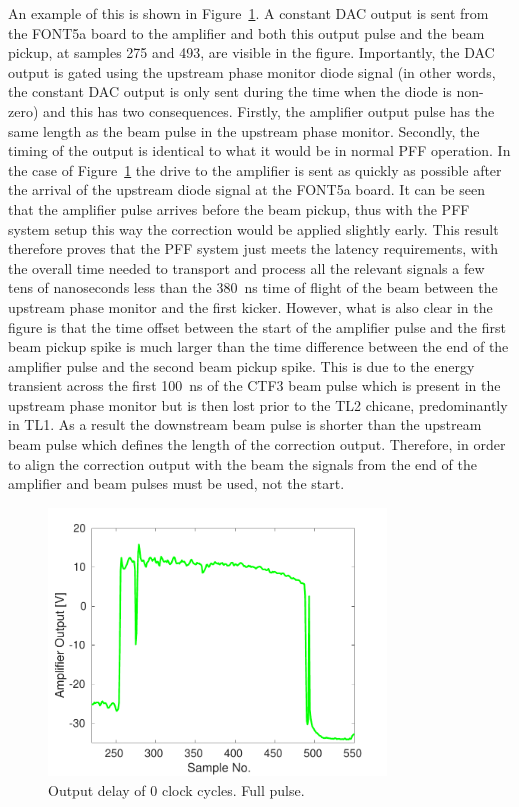 An example of this is shown in Figure~\ref{f:absDelay0_all}. A constant DAC output is sent from the FONT5a board to the amplifier and both this output pulse and the beam pickup, at samples 275 and 493, are visible in the figure. Importantly, the DAC output is gated using the upstream phase monitor diode signal (in other words, the constant DAC output is only sent during the time when the diode is non-zero) and this has two consequences. Firstly, the amplifier output pulse has the same length as the beam pulse in the upstream phase monitor. Secondly, the timing of the output is identical to what it would be in normal PFF operation. In the case of Figure~\ref{f:absDelay0_all} the drive to the amplifier is sent as quickly as possible after the arrival of the upstream diode signal at the FONT5a board. It can be seen that the amplifier pulse arrives before the beam pickup, thus with the PFF system setup this way the correction would be applied slightly early. This result therefore proves that the PFF system just meets the latency requirements, with the overall time needed to transport and process all the relevant signals a few tens of nanoseconds less than the 380~ns time of flight of the beam between the upstream phase monitor and the first kicker. However, what is also clear in the figure is that the time offset between the start of the amplifier pulse and the first beam pickup spike is much larger than the time difference between the end of the amplifier pulse and the second beam pickup spike. This is due to the energy transient across the first 100~ns of the CTF3 beam pulse which is present in the upstream phase monitor but is then lost prior to the TL2 chicane, predominantly in TL1. As a result the downstream beam pulse is shorter than the upstream beam pulse which defines the length of the correction output. Therefore, in order to align the correction output with the beam the signals from the end of the amplifier and beam pulses must be used, not the start.

\begin{figure}
  \centering
  \includegraphics[width=0.8\textwidth]{Figures/commissioning/absDelay0_all}
  \caption{Output delay of 0 clock cycles. Full pulse.}
  \label{f:absDelay0_all}
\end{figure}

